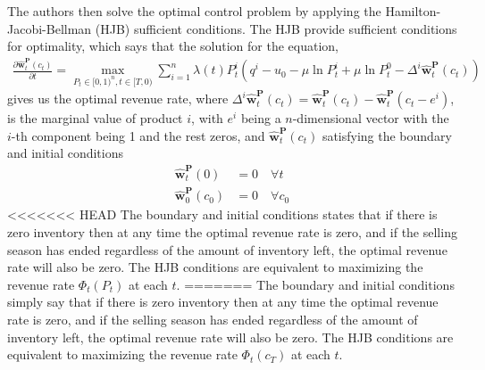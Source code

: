 

The authors then solve the optimal control problem by applying the Hamilton-Jacobi-Bellman (HJB) sufficient conditions. The HJB provide sufficient conditions for optimality, which says that the solution for the equation,
\begin{align}
\frac{\partial \hat{\mathbf{w}}_t^{\mathbf{P}}(c_t)}{\partial t} = \max_{P_t \in [0,1)^n, t \in [T,0)}\sum_{i=1}^{n} \lambda(t)P_t^i \left(q^i-u_0-\mu \ln P_t^i + \mu \ln P_t^0- \Delta^i \hat{\mathbf{w}}_t^{\mathbf{P}}(c_t)\right) \label{eq:HJBsufficient}
\end{align}
gives us the optimal revenue rate, %
where $\Delta^i \hat{\mathbf{w}}_t^{\mathbf{P}}(c_t) = \hat{\mathbf{w}}_t^{\mathbf{P}}(c_t) - \hat{\mathbf{w}}_t^{\mathbf{P}}(c_t-e^i)$, is the marginal value of product $i$, with $e^i$ being a $n$-dimensional vector with the $i$-th component being 1 and the rest zeros, and $\hat{\mathbf{w}}_t^{\mathbf{P}}(c_t)$ satisfying the boundary and initial conditions
\begin{align}
\hat{\mathbf{w}}_t^{\mathbf{P}}(0) &= 0 \quad \forall t\\
\hat{\mathbf{w}}_0^{\mathbf{P}}(c_0) &= 0 \quad \forall c_0
\end{align}
<<<<<<< HEAD
The boundary and initial conditions states that if there is zero inventory then at any time the optimal revenue rate is zero, and if the selling season has ended regardless of the amount of inventory left, the optimal revenue rate will also be zero. The HJB conditions are equivalent to maximizing the revenue rate $\Phi_t(P_t)$ at each $t$.
=======
The boundary and initial conditions simply say that if there is zero inventory then at any time the optimal revenue rate is zero, and if the selling season has ended regardless of the amount of inventory left, the optimal revenue rate will also be zero. The HJB conditions are equivalent to maximizing the revenue rate $\Phi_t(c_T)$  at each $t$.

